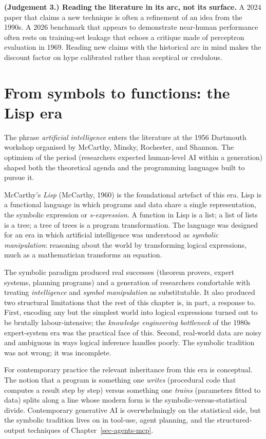 \documentclass[
  letterpaper,
  11pt]{scrbook}
\begin{document}
\textbf{(Judgement 3.) Reading the literature in its arc, not its
surface.} A 2024 paper that claims a new technique is often a refinement
of an idea from the 1990s. A 2026 benchmark that appears to demonstrate
near-human performance often rests on training-set leakage that echoes a
critique made of perceptron evaluation in 1969. Reading new claims with
the historical arc in mind makes the discount factor on hype calibrated
rather than sceptical or credulous.

\section{From symbols to functions: the Lisp
era}\label{from-symbols-to-functions-the-lisp-era}

The phrase \emph{artificial intelligence} enters the literature at the
1956 Dartmouth workshop organised by McCarthy, Minsky, Rochester, and
Shannon. The optimism of the period (researchers expected human-level AI
within a generation) shaped both the theoretical agenda and the
programming languages built to pursue it.

McCarthy's \emph{Lisp} (McCarthy, 1960) is the foundational artefact of
this era. Lisp is a functional language in which programs and data share
a single representation, the symbolic expression or \emph{s-expression}.
A function in Lisp is a list; a list of lists is a tree; a tree of trees
is a program transformation. The language was designed for an era in
which artificial intelligence was understood as \emph{symbolic
manipulation}: reasoning about the world by transforming logical
expressions, much as a mathematician transforms an equation.

The symbolic paradigm produced real successes (theorem provers, expert
systems, planning programs) and a generation of researchers comfortable
with treating \emph{intelligence} and \emph{symbol manipulation} as
substitutable. It also produced two structural limitations that the rest
of this chapter is, in part, a response to. First, encoding any but the
simplest world into logical expressions turned out to be brutally
labour-intensive; the \emph{knowledge engineering bottleneck} of the
1980s expert-system era was the practical face of this. Second,
real-world data are noisy and ambiguous in ways logical inference
handles poorly. The symbolic tradition was not wrong; it was incomplete.

For contemporary practice the relevant inheritance from this era is
conceptual. The notion that a program is something one \emph{writes}
(procedural code that computes a result step by step) versus something
one \emph{trains} (parameters fitted to data) splits along a line whose
modern form is the symbolic-versus-statistical divide. Contemporary
generative AI is overwhelmingly on the statistical side, but the
symbolic tradition lives on in tool-use, agent planning, and the
structured-output techniques of Chapter~\ref{sec-agents-mcp}.
\end{document}
